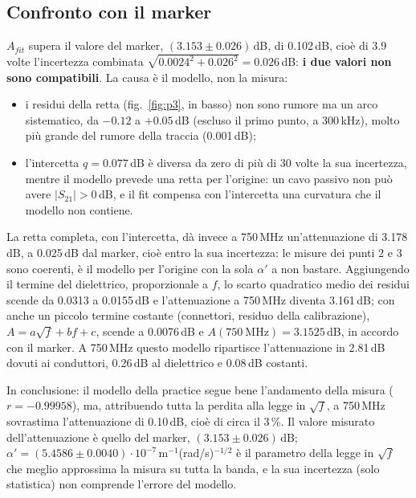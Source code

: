 \documentclass[11pt,a4paper,oneside]{book}
\begin{document}
\subsection{Confronto con il marker}
$A_{fit}$ supera il valore del marker, $(3.153\pm0.026)$\,dB, di 0.102\,dB, cioè di 3.9 volte l'incertezza combinata $\sqrt{0.0024^2+0.026^2} = 0.026$\,dB: \textbf{i due valori non sono compatibili}. La causa è il modello, non la misura:
\begin{itemize}
  \item i residui della retta (fig.~\ref{fig:p3}, in basso) non sono rumore ma un arco sistematico, da $-0.12$ a $+0.05$\,dB (escluso il primo punto, a 300\,kHz), molto più grande del rumore della traccia (0.001\,dB);
  \item l'intercetta $q = 0.077$\,dB è diversa da zero di più di 30 volte la sua incertezza, mentre il modello prevede una retta per l'origine: un cavo passivo non può avere $|S_{21}|>0$\,dB, e il fit compensa con l'intercetta una curvatura che il modello non contiene.
\end{itemize}
La retta completa, con l'intercetta, dà invece a 750\,MHz un'attenuazione di 3.178\,dB, a 0.025\,dB dal marker, cioè entro la sua incertezza: le misure dei punti 2 e 3 sono coerenti, è il modello per l'origine con la sola $\alpha'$ a non bastare. Aggiungendo il termine del dielettrico, proporzionale a $f$, lo scarto quadratico medio dei residui scende da 0.0313 a 0.0155\,dB e l'attenuazione a 750\,MHz diventa 3.161\,dB; con anche un piccolo termine costante (connettori, residuo della calibrazione), $A = a\sqrt f + bf + c$, scende a 0.0076\,dB e $A(750\ \mathrm{MHz}) = 3.1525$\,dB, in accordo con il marker. A 750\,MHz questo modello ripartisce l'attenuazione in 2.81\,dB dovuti ai conduttori, 0.26\,dB al dielettrico e 0.08\,dB costanti.

In conclusione: il modello della practice segue bene l'andamento della misura ($r = -0.99958$), ma, attribuendo tutta la perdita alla legge in $\sqrt f$, a 750\,MHz sovrastima l'attenuazione di 0.10\,dB, cioè di circa il 3\,\%. Il valore misurato dell'attenuazione è quello del marker, $(3.153\pm0.026)$\,dB; $\alpha' = (5.4586\pm0.0040)\cdot10^{-7}$\,m$^{-1}$(rad/s)$^{-1/2}$ è il parametro della legge in $\sqrt f$ che meglio approssima la misura su tutta la banda, e la sua incertezza (solo statistica) non comprende l'errore del modello.
\end{document}
